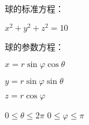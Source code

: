 \documentclass[UTF8]{ctexart}
\begin{document}
球的标准方程：

$x^{2}+y^{2}+z^{2}=10$

球的参数方程：

$x=r\sin\varphi\cos\theta$

$y=r\sin\varphi\sin\theta$

$z=r\cos\varphi$

$0\leq\theta\leq2\pi$ $0\leq\varphi\leq\pi$
\end{document}
